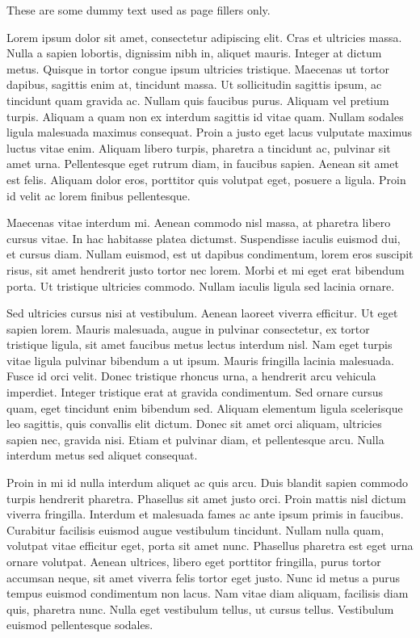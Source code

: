 These are some dummy text used as page fillers only.

Lorem ipsum dolor sit amet, consectetur adipiscing elit. Cras et
ultricies massa. Nulla a sapien lobortis, dignissim nibh in, aliquet
mauris. Integer at dictum metus. Quisque in tortor congue ipsum
ultricies tristique. Maecenas ut tortor dapibus, sagittis enim at,
tincidunt massa. Ut sollicitudin sagittis ipsum, ac tincidunt quam
gravida ac. Nullam quis faucibus purus. Aliquam vel pretium
turpis. Aliquam a quam non ex interdum sagittis id vitae quam. Nullam
sodales ligula malesuada maximus consequat. Proin a justo eget lacus
vulputate maximus luctus vitae enim. Aliquam libero turpis, pharetra a
tincidunt ac, pulvinar sit amet urna. Pellentesque eget rutrum diam,
in faucibus sapien. Aenean sit amet est felis. Aliquam dolor eros,
porttitor quis volutpat eget, posuere a ligula. Proin id velit ac
lorem finibus pellentesque.

Maecenas vitae interdum mi. Aenean commodo nisl massa, at pharetra
libero cursus vitae. In hac habitasse platea dictumst. Suspendisse
iaculis euismod dui, et cursus diam. Nullam euismod, est ut dapibus
condimentum, lorem eros suscipit risus, sit amet hendrerit justo
tortor nec lorem. Morbi et mi eget erat bibendum porta. Ut tristique
ultricies commodo. Nullam iaculis ligula sed lacinia ornare.

Sed ultricies cursus nisi at vestibulum. Aenean laoreet viverra
efficitur. Ut eget sapien lorem. Mauris malesuada, augue in pulvinar
consectetur, ex tortor tristique ligula, sit amet faucibus metus
lectus interdum nisl. Nam eget turpis vitae ligula pulvinar bibendum a
ut ipsum. Mauris fringilla lacinia malesuada. Fusce id orci
velit. Donec tristique rhoncus urna, a hendrerit arcu vehicula
imperdiet. Integer tristique erat at gravida condimentum. Sed ornare
cursus quam, eget tincidunt enim bibendum sed. Aliquam elementum
ligula scelerisque leo sagittis, quis convallis elit dictum. Donec sit
amet orci aliquam, ultricies sapien nec, gravida nisi. Etiam et
pulvinar diam, et pellentesque arcu. Nulla interdum metus sed aliquet
consequat.

Proin in mi id nulla interdum aliquet ac quis arcu. Duis blandit
sapien commodo turpis hendrerit pharetra. Phasellus sit amet justo
orci. Proin mattis nisl dictum viverra fringilla. Interdum et
malesuada fames ac ante ipsum primis in faucibus. Curabitur facilisis
euismod augue vestibulum tincidunt. Nullam nulla quam, volutpat vitae
efficitur eget, porta sit amet nunc. Phasellus pharetra est eget urna
ornare volutpat. Aenean ultrices, libero eget porttitor fringilla,
purus tortor accumsan neque, sit amet viverra felis tortor eget
justo. Nunc id metus a purus tempus euismod condimentum non lacus. Nam
vitae diam aliquam, facilisis diam quis, pharetra nunc. Nulla eget
vestibulum tellus, ut cursus tellus. Vestibulum euismod pellentesque
sodales.

